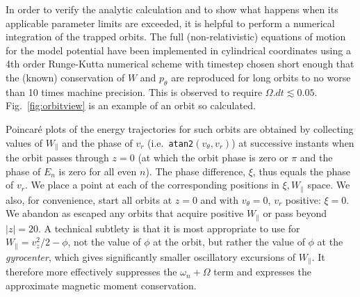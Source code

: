 \documentclass[draft,jgrga]{agutex}
\begin{document}
\begin{article}
In order to verify the analytic calculation and to show what happens
when its applicable parameter limits are exceeded, it is helpful to
perform a numerical integration of the trapped orbits. The full
(non-relativistic) equations of motion for the model potential have
been implemented in cylindrical coordinates using a 4th order
Runge-Kutta numerical scheme with timestep chosen short enough that
the (known) conservation of $W$ and $p_\theta$ are reproduced for long
orbits to no worse than 10 times machine precision. This is observed
to require $\Omega.dt\lesssim 0.05$. Fig.\ \ref{fig:orbitview} is an
example of an orbit so calculated.

Poincar\'e plots of the energy trajectories for such orbits are
obtained by collecting values of $W_\parallel$ and the phase of $v_r$
(i.e.\ \verb!atan2!$(v_\theta,v_r)$) at successive instants when the orbit passes through $z=0$ (at which
the orbit phase is zero or $\pi$ and the phase of $E_n$ is zero for
all even $n$). The phase difference, $\xi$, thus equals the phase of
$v_r$. We place a point at each of the corresponding positions in
$\xi,W_\parallel$ space. We also, for convenience, start all orbits at
$z=0$ and with $v_\theta=0$, $v_r$ positive: $\xi=0$. We abandon as escaped any
orbits that acquire positive $W_\parallel$ or pass beyond $|z|=20$.  A
technical subtlety is that it is most appropriate to use for
$W_\parallel=v_z^2/2-\phi$, not the value of $\phi$ at the orbit, but
rather the value of $\phi$ at the \emph{gyrocenter}, which gives
significantly smaller oscillatory excursions of $W_\parallel$. It
therefore more effectively suppresses the $\omega_n+\Omega$ term and
expresses the approximate magnetic moment conservation.


\end{article}
\end{document}
